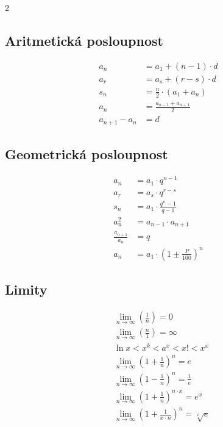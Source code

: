 \documentclass[12pt,a4paper]{article}
\begin{document}
\begin{multicols}{2}

\subsection*{Aritmetická posloupnost}
\begin{align*}
a_n &= a_1 + (n - 1) \cdot d \\
a_r &= a_s + (r - s) \cdot d \\
s_n &= \frac{n}{2} \cdot (a_1 + a_n) \\
a_n &= \frac{a_{n-1} + a_{n+1}}{2} \\
a_{n+1} - a_n &= d
\end{align*}

\subsection*{Geometrická posloupnost}
\begin{align*}
a_n &= a_1 \cdot q^{n-1} \\
a_r &= a_s \cdot q^{r-s} \\
s_n &= a_1 \cdot \frac{q^n - 1}{q - 1} \\
a_n^2 &= a_{n-1} \cdot a_{n+1} \\
\frac{a_{n+1}}{a_n} &= q \\
a_n &= a_1 \cdot \left(1 \pm \frac{P}{100}\right)^n
\end{align*}

\subsection*{Limity}
\begin{align*}
&\lim_{n \to \infty} \left(\frac{1}{n}\right) = 0 \\
&\lim_{n \to \infty} \left(\frac{n}{1}\right) = \infty \\
&\ln x < x^k < a^x < x! < x^x \\
&\lim_{n \to \infty} \left(1 + \frac{1}{n}\right)^n = e \\
&\lim_{n \to \infty} \left(1 - \frac{1}{n}\right)^n = \frac{1}{e} \\
&\lim_{n \to \infty} \left(1 + \frac{1}{n}\right)^{n \cdot x} = e^x \\
&\lim_{n \to \infty} \left(1 + \frac{1}{x \cdot n}\right)^n = \sqrt[x]{e}
\end{align*}

\columnbreak


\end{multicols}
\end{document}
